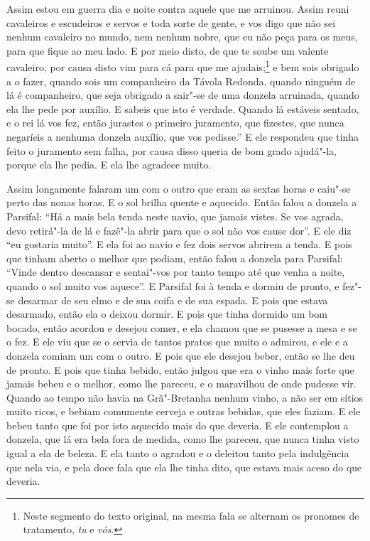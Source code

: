 Assim estou em guerra dia e noite contra aquele que me arruinou. Assim reuni
cavaleiros e escudeiros e servos e toda sorte de gente, e vos digo que não sei
nenhum cavaleiro no mundo, nem nenhum nobre, que eu não peça para os meus, para
que fique ao meu lado. E por meio disto, de que te soube um valente cavaleiro,
por causa disto vim para cá para que me ajudais;\footnote{ Neste segmento do
texto original, na mesma fala se alternam os pronomes de tratamento,
\textit{tu} e \textit{vós}.} e bem sois obrigado a o fazer,
quando sois um companheiro da Távola Redonda, quando ninguém de lá é
companheiro, que seja obrigado a sair"-se de uma donzela arruinada, quando ela
lhe pede por auxílio. E sabeis que isto é verdade. Quando lá estáveis sentado,
e o rei lá vos fez, então jurastes o primeiro juramento, que fizestes, que
nunca negaríeis a nenhuma donzela auxílio, que vos pedisse.” E ele respondeu
que tinha feito o juramento sem falha, por causa disso queria de bom grado
ajudá"-la, porque ela lhe pedia. E ela lhe agradece muito.

Assim longamente falaram um com o outro que eram as sextas horas e caiu"-se
perto das nonas horas. E o sol brilha quente e aquecido. Então falou a donzela
a Parsifal: ``Há a mais bela tenda neste navio, que jamais vistes. Se vos
agrada, devo retirá"-la de lá e fazê"-la abrir para que o sol não vos cause dor”.
E ele diz ``eu gostaria muito''. E ela foi ao navio e fez dois servos abrirem a
tenda. E pois que tinham aberto o melhor que podiam, então falou a donzela para
Parsifal: “Vinde dentro descansar e sentai"-vos por tanto tempo até que venha a
noite, quando o sol muito vos aquece”. E Parsifal foi à tenda e dormiu de
pronto, e fez"-se desarmar de seu elmo e de sua coifa e de sua espada. E pois
que estava desarmado, então ela o deixou dormir. E pois que tinha dormido um
bom bocado, então acordou e desejou comer, e ela chamou que se pusesse a mesa e
se o fez. E ele viu que se o servia de tantos pratos que muito o admirou, e ele
e a donzela comiam um com o outro. E pois que ele desejou beber, então se lhe
deu de pronto. E pois que tinha bebido, então julgou que era o vinho mais forte
que jamais bebeu e o melhor, como lhe pareceu, e o maravilhou de onde pudesse
vir. Quando ao tempo não havia na Grã"-Bretanha nenhum vinho, a não ser em
sítios muito ricos, e bebiam comumente cerveja e outras bebidas, que eles
faziam. E ele bebeu tanto que foi por isto aquecido mais do que
deveria. E ele contemplou a donzela, que lá era bela fora de medida, como lhe
pareceu, que nunca tinha visto igual a ela de beleza. E ela tanto o agradou e o
deleitou tanto pela indulgência que nela via, e pela doce fala que ela lhe
tinha dito, que estava mais aceso do que deveria.

